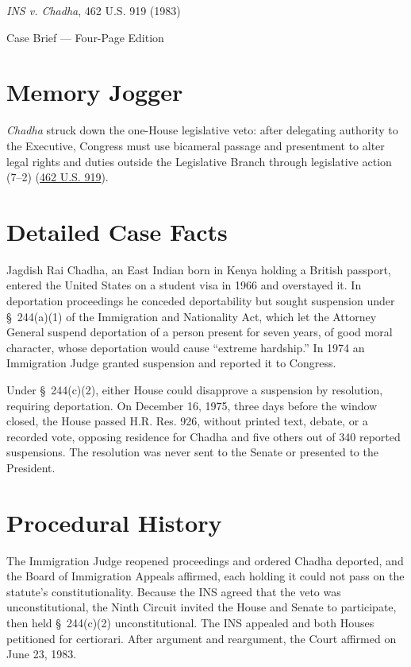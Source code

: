 \documentclass[12pt]{article}
\begin{document}
\begin{center}
{\LARGE \textit{INS v. Chadha}, 462 U.S. 919 (1983)\par}
\vspace{0.8em}
{\large Case Brief --- Four-Page Edition\par}
\end{center}
\vspace{1em}

\section{Memory Jogger}

\textit{Chadha} struck down the one-House legislative veto: after delegating authority to the Executive, Congress must use bicameral passage and presentment to alter legal rights and duties outside the Legislative Branch through legislative action (7--2) (\href{https://supreme.justia.com/cases/federal/us/462/919/}{462 U.S. 919}).

\section{Detailed Case Facts}

Jagdish Rai Chadha, an East Indian born in Kenya holding a British passport, entered the United States on a student visa in 1966 and overstayed it. In deportation proceedings he conceded deportability but sought suspension under \S~244(a)(1) of the Immigration and Nationality Act, which let the Attorney General suspend deportation of a person present for seven years, of good moral character, whose deportation would cause ``extreme hardship.'' In 1974 an Immigration Judge granted suspension and reported it to Congress.

Under \S~244(c)(2), either House could disapprove a suspension by resolution, requiring deportation. On December 16, 1975, three days before the window closed, the House passed H.R. Res. 926, without printed text, debate, or a recorded vote, opposing residence for Chadha and five others out of 340 reported suspensions. The resolution was never sent to the Senate or presented to the President.

\section{Procedural History}

The Immigration Judge reopened proceedings and ordered Chadha deported, and the Board of Immigration Appeals affirmed, each holding it could not pass on the statute's constitutionality. Because the INS agreed that the veto was unconstitutional, the Ninth Circuit invited the House and Senate to participate, then held \S~244(c)(2) unconstitutional. The INS appealed and both Houses petitioned for certiorari. After argument and reargument, the Court affirmed on June 23, 1983.
\end{document}
